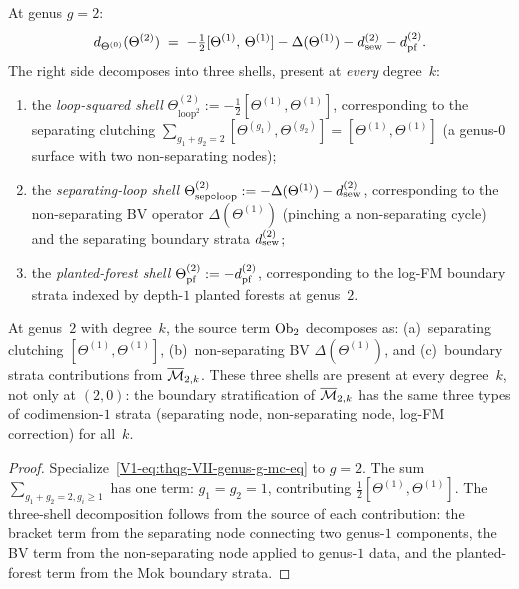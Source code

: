 \begin{proposition}
\label{prop:thqg-VII-genus2}
At genus $g = 2$:
\begin{equation}%
d_{\Theta^{(0)}}(\Theta^{(2)})
\;=\;
-\tfrac{1}{2}[\Theta^{(1)},\, \Theta^{(1)}]
- \Delta(\Theta^{(1)})
- \dsew^{(2)}
- \dpf^{(2)}.
\end{equation}
The right side decomposes into three shells, present at
\emph{every} degree~$k$:
\begin{enumerate}[label=\textup{(\roman*)}]
\item the \emph{loop-squared shell}
 $\Theta^{(2)}_{\mathrm{loop}^2} :=
 -\tfrac{1}{2}[\Theta^{(1)},\Theta^{(1)}]$,
 corresponding to the separating clutching
 $\sum_{g_1+g_2=2}[\Theta^{(g_1)},\Theta^{(g_2)}]
 = [\Theta^{(1)},\Theta^{(1)}]$
 (a genus-$0$ surface with two non-separating nodes);
\item the \emph{separating-loop shell}
 $\Theta^{(2)}_{\mathrm{sep}\circ\mathrm{loop}} :=
 -\Delta(\Theta^{(1)}) - d_{\mathrm{sew}}^{(2)}$,
 corresponding to the non-separating BV operator
 $\Delta(\Theta^{(1)})$ (pinching a non-separating cycle)
 and the separating boundary strata $d_{\mathrm{sew}}^{(2)}$;
\item the \emph{planted-forest shell}
 $\Theta^{(2)}_{\mathrm{pf}} :=
 -d_{\mathrm{pf}}^{(2)}$,
 corresponding to the log-FM boundary strata indexed by
 depth-$1$ planted forests at genus~$2$.
\end{enumerate}
At genus~$2$ with degree~$k$, the source term $\mathrm{Ob}_2$ decomposes
as: (a)~separating clutching
$[\Theta^{(1)},\Theta^{(1)}]$, (b)~non-separating BV
$\Delta(\Theta^{(1)})$, and (c)~boundary strata contributions
from $\overline{\mathcal{M}}_{2,k}$. These three shells are present
at every degree~$k$, not only at $(2,0)$: the boundary
stratification of $\overline{\mathcal{M}}_{2,k}$ has the same three
types of codimension-$1$ strata (separating node, non-separating
node, log-FM correction) for all~$k$.
\end{proposition}

\begin{proof}
Specialize~\eqref{V1-eq:thqg-VII-genus-g-mc-eq} to $g = 2$. The
sum $\sum_{g_1+g_2=2, g_i \geq 1}$ has one term: $g_1 = g_2 = 1$,
contributing $\tfrac{1}{2}[\Theta^{(1)},\Theta^{(1)}]$. The
three-shell decomposition follows from the source of each
contribution: the bracket term from the separating node
connecting two genus-$1$ components, the BV term from the
non-separating node applied to genus-$1$ data, and the
planted-forest term from the Mok boundary strata.
\end{proof}

